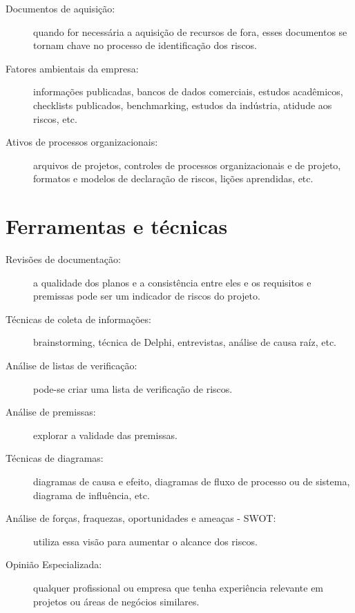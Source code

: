 \begin{description}
	\item[Documentos de aquisição:] quando for necessária a aquisição de recursos de fora, esses documentos se tornam chave no processo de identificação dos riscos.
	
	\item[Fatores ambientais da empresa:] informações publicadas, bancos de dados comerciais, estudos acadêmicos, checklists publicados, benchmarking, estudos da indústria, atidude aos riscos, etc.
	
	\item[Ativos de processos organizacionais:] arquivos de projetos, controles de processos organizacionais e de projeto, formatos e modelos de declaração de riscos, lições aprendidas, etc.
	
\end{description}

\section{Ferramentas e técnicas}

\begin{description}
	
	\item[Revisões de documentação:] a qualidade dos planos e a consistência entre eles e os requisitos e premissas pode ser um indicador de riscos do projeto.
	
	\item[Técnicas de coleta de informações:] brainstorming, técnica de Delphi, entrevistas, análise de causa raíz, etc.
	
	\item[Análise de listas de verificação:] pode-se criar uma lista de verificação de riscos.
	
	\item[Análise de premissas:] explorar a validade das premissas.
	
	\item[Técnicas de diagramas:] diagramas de causa e efeito, diagramas de fluxo de processo ou de sistema, diagrama de influência, etc.
	
	\item[Análise de forças, fraquezas, oportunidades e ameaças - SWOT:] utiliza essa visão para aumentar o alcance dos riscos.
	
	\item[Opinião Especializada:] qualquer profissional ou empresa que tenha experiência relevante em projetos ou áreas de negócios similares.

\end{description}

